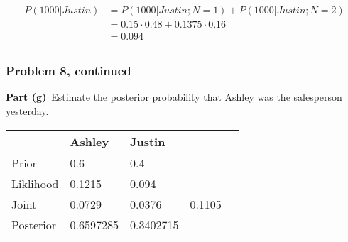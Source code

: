 \documentclass[12pt]{article}
\theoremstyle{definition}
\begin{document}
\begin{align*}
P(1000|Justin) &= P(1000|Justin;N=1) + P(1000|Justin;N=2)\\
&= 0.15 \cdot 0.48 + 0.1375 \cdot 0.16\\
&= 0.094\\
\end{align*}

\newpage
\subsubsection*{Problem 8, continued}
\noindent
{\bf Part (g)}\ Estimate the posterior probability that Ashley was the salesperson yesterday.\\

\begin{tabular}{lllll}
&   Ashley   &   Justin   \\
\hline
Prior      &   0.6   &   0.4   &\\
Liklihood  &   0.1215   &   0.094   &\\
Joint      &   0.0729   &   0.0376   &   0.1105\\
Posterior  &   0.6597285   &   0.3402715   &\\
\hline
\end{tabular}
\end{document}
